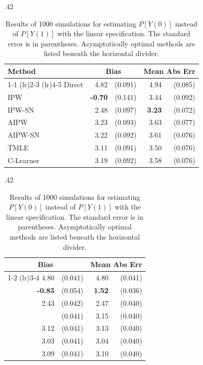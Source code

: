 \begin{table}[H]
\footnotesize
\hfill
\hspace*{\fill}
\begin{subtable}{.42\linewidth}
\centering
\caption{$N=200$}
\begin{tabular}{lrrrr}
\toprule
Method & \multicolumn{2}{c}{Bias} & \multicolumn{2}{c}{Mean Abs Err} \\
\cmidrule(lr){1-1}
\cmidrule(lr){2-3}
\cmidrule(lr){4-5}
Direct & 4.82 & (0.091) & 4.94 & (0.085) \\ 
IPW & \textbf{-0.70} & (0.141) & 3.44 & (0.092)  \\ 
IPW-SN & 2.48 & (0.097) & \textbf{3.23} & (0.072)  \\
    \greymidrule
AIPW & 3.23 & (0.093) & 3.63 & (0.077)  \\ 
AIPW-SN & 3.22 & (0.092) & 3.61 & (0.076)  \\ 
TMLE & 3.11 & (0.091) & 3.50 & (0.076)  \\ 
C-Learner & 3.19 & (0.092) & 3.58 & (0.076)  \\ 
\bottomrule
\end{tabular}
\end{subtable}
\begin{subtable}{.42\linewidth}
\centering
\caption{$N=1000$} %
\begin{tabular}{rrrr}
\toprule
 \multicolumn{2}{c}{Bias} & \multicolumn{2}{c}{Mean Abs Err} \\
\cmidrule(lr){1-2}
\cmidrule(lr){3-4}
 4.80 & (0.041) & 4.80 & (0.041)  \\ 
 \textbf{-0.83} & (0.054) & \textbf{1.52} & (0.036)  \\  
2.43 & (0.042) & 2.47 & (0.040)  \\
    \greymidrule
3.14 & (0.041) & 3.15 & (0.040) \\ 
 3.12 & (0.041) & 3.13 & (0.040)  \\ 
 3.03 & (0.041) & 3.04 & (0.040)  \\ 
3.09 & (0.041) & 3.10 & (0.040) \\
\bottomrule
\end{tabular}
\end{subtable}
\hfill
\hspace*{\fill}
\caption{Results of 1000 simulations for estimating $P[Y(0)]$ instead of $P[Y(1)]$  with the linear specification. The standard error is in parentheses. Asymptotically optimal methods are listed beneath the horizontal divider.}
\label{tb:flipped_ks}
\end{table}








